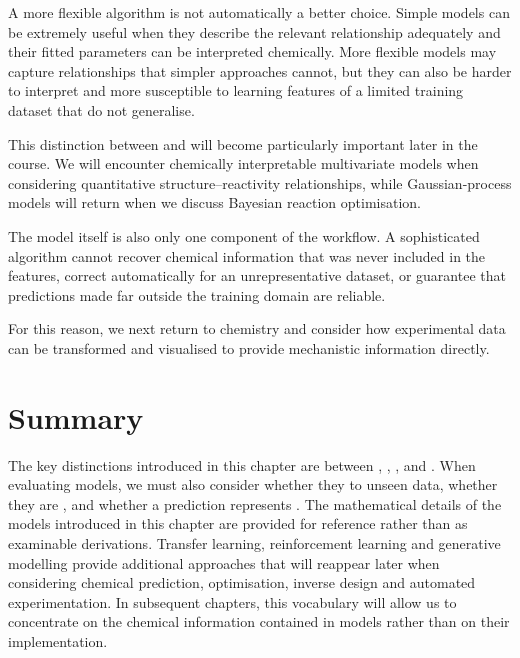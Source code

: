 A more flexible algorithm is not automatically a better choice.
Simple models can be extremely useful when they describe the relevant relationship adequately and their fitted parameters can be interpreted chemically.
More flexible models may capture relationships that simpler approaches cannot, but they can also be harder to interpret and more susceptible to learning features of a limited training dataset that do not generalise.

This distinction between  and  will become particularly important later in the course.
We will encounter chemically interpretable multivariate models when considering quantitative structure--reactivity relationships, while Gaussian-process models will return when we discuss Bayesian reaction optimisation.

The model itself is also only one component of the workflow.
A sophisticated algorithm cannot recover chemical information that was never included in the features, correct automatically for an unrepresentative dataset, or guarantee that predictions made far outside the training domain are reliable.

For this reason, we next return to chemistry and consider how experimental data can be transformed and visualised to provide mechanistic information directly.

\section{Summary}

The key distinctions introduced in this chapter are between , , , and .
When evaluating models, we must also consider whether they  to unseen data, whether they are , and whether a prediction represents .
The mathematical details of the models introduced in this chapter are provided for reference rather than as examinable derivations.
Transfer learning, reinforcement learning and generative modelling provide additional approaches that will reappear later when considering chemical prediction, optimisation, inverse design and automated experimentation.
In subsequent chapters, this vocabulary will allow us to concentrate on the chemical information contained in models rather than on their implementation.